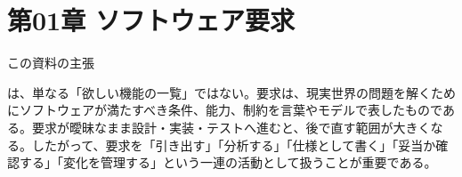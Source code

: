\section{第01章 ソフトウェア要求}
\noindent この資料の主張

は、単なる「欲しい機能の一覧」ではない。要求は、現実世界の問題を解くためにソフトウェアが満たすべき条件、能力、制約を言葉やモデルで表したものである。要求が曖昧なまま設計・実装・テストへ進むと、後で直す範囲が大きくなる。したがって、要求を「引き出す」「分析する」「仕様として書く」「妥当か確認する」「変化を管理する」という一連の活動として扱うことが重要である。

